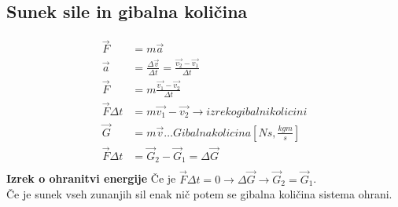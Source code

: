 {\color{indiagreen}\subsection{Sunek sile in gibalna količina}}
\begin{align*}
	\vec{F} &= m\vec{a}\\
	\vec{a} &= \frac{\Delta\vec{v}}{\Delta t} = \frac{\vec{v_2}-\vec{v_1}}{\Delta t}\\
	\vec{F} &= m\frac{\vec{v_1}-\vec{v_2}}{\Delta t}\\
	\vec{F}\Delta t &= m\vec{v_1}-\vec{v_2} \rightarrow izrek o gibalni kolicini\\
	\vec{G} &= m\vec{v} \dots Gibalna kolicina [Ns, \frac{kgm}{s}]\\
	\vec{F}\Delta t &= \vec{G}_2 - \vec{G}_1 = \Delta\vec{G}\\
\end{align*}
\textbf{Izrek o ohranitvi energije}
Če je $\vec{F}\Delta t = 0 \rightarrow \Delta\vec{G} \rightarrow \vec{G}_2 = \vec{G}_1$.\\
Če je sunek vseh zunanjih sil enak nič potem se gibalna količina sistema ohrani.